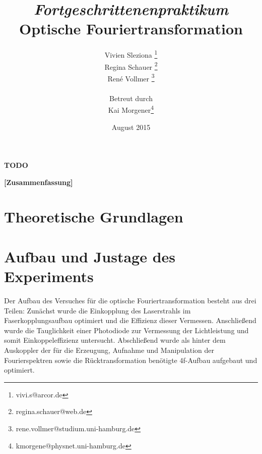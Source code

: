 \documentclass[12pt,a4paper]{article}
\begin{document}
	
	\textbf{TODO}
	
	
	
	\title{\textit{Fortgeschrittenenpraktikum}\\\textbf{Optische Fouriertransformation} }
	\date{August 2015}
	\author{Vivien Sleziona \footnote{vivi.s@arcor.de}\\ Regina Schauer \footnote{regina.schauer@web.de}\\ René Vollmer \footnote{rene.vollmer@studium.uni-hamburg.de} \\ \\Betreut durch\\ Kai Morgener\footnote{kmorgene@physnet.uni-hamburg.de}}
	
	\maketitle
	
	\begin{center} 
		\bigskip
		\bigskip
		
		\begin{minipage}{0.75\textwidth}
			\textbf{[Zusammenfassung]}
			
		\end{minipage}
	\end{center}
	
	\newpage
	
	\tableofcontents
	\vfill
	\newpage
	\clearpage	
	
	
	\section{Theoretische Grundlagen}
	

	
	\newpage
	\clearpage
	\section{Aufbau und Justage des Experiments}
	Der Aufbau des Versuches für die optische Fouriertransformation besteht aus drei Teilen: Zunächst wurde die Einkopplung des Laserstrahls im Faserkopplungsaufbau optimiert und die Effizienz dieser Vermessen. Anschließend wurde die Tauglichkeit einer Photodiode zur Vermessung der Lichtleistung und somit Einkoppeleffizienz untersucht. Abschließend wurde als hinter dem Auskoppler der für die Erzeugung, Aufnahme und Manipulation der Fourierspektren sowie die Rücktransformation benötigte 4f-Aufbau aufgebaut und optimiert.
	
\end{document}

